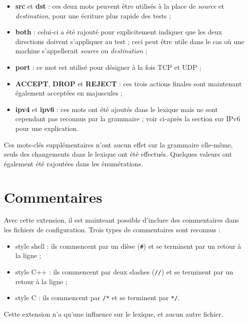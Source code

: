 \documentclass[a4paper,11pt]{report}
\newcommand{\strong}[1]{\textbf{#1}}
\begin{document}
\begin{itemize}
  \item\strong{src} et \strong{dst} : ces deux mots peuvent être utilisés à
    la place de \emph{source} et \emph{destination}, pour une écriture plus
    rapide des tests ;
  \item\strong{both} : celui-ci a été rajouté pour explicitement indiquer que
    les deux directions doivent s'appliquer au test ; ceci peut être utile
    dans le cas où une machine s'appellerait \emph{source} ou
    \emph{destination} ;
  \item\strong{port} : ce mot est utilisé pour désigner à la fois TCP et UDP ;
  \item\strong{ACCEPT}, \strong{DROP} et \strong{REJECT} : ces trois
    \og actions finales\fg{} sont maintenant également acceptées en
    majuscules ;
  \item\strong{ipv4} et \strong{ipv6} : ces mots ont été ajoutés dans le
    lexique mais ne sont cependant pas reconnus par la grammaire ; voir
    ci-après la section sur IPv6 pour une explication.
\end{itemize}

\bigskip
Ces mots-clés supplémentaires n'ont aucun effet sur la grammaire elle-même,
seuls des changements dans le lexique ont été effectués. Quelques valeurs ont
également été rajoutées dans les énumérations.

\section{Commentaires}

Avec cette extension, il est mainteant possible d'inclure des commentaires
dans les fichiers de configuration. Trois types de commentaires sont
reconnus :

\begin{itemize}
  \item style shell : ils commencent par un dièse (\og\texttt{\#}\fg) et se
    terminent par un retour à la ligne ;
  \item style C++ : ils commencent par deux slashes (\og\texttt{//}\fg) et se
    terminent par un retour à la ligne ;
  \item style C : ils commencent par \og\texttt{/*}\fg{} et se terminent par
    \og\texttt{*/}\fg.
\end{itemize}

\bigskip
Cette extension n'a qu'une influence sur le lexique, et aucun autre fichier.
\end{document}

